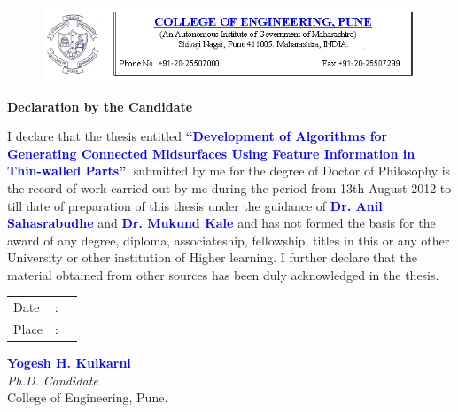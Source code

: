 \begin{figure} [!h]
	\centering
	\includegraphics[width=\linewidth]{..//Common/images/coep_header.png}
\end{figure}

\vspace*{50pt}

\begin{center}{\Huge \textbf{Declaration by the Candidate}}\end{center}

\vspace*{20pt}

\begin{flushleft}
I declare that the thesis entitled \textcolor{blue}{\textbf{``Development of Algorithms for Generating Connected Midsurfaces Using Feature Information in Thin-walled Parts''}}, submitted by me for the degree of Doctor of Philosophy is the record of work carried out by me during the period from 13th August 2012 to till date of preparation of this thesis under the guidance of \textcolor{blue}{\textbf{Dr. Anil Sahasrabudhe}} and \textcolor{blue}{\textbf{Dr. Mukund Kale}} and has not formed the basis for the award of any degree, diploma, associateship, fellowship, titles in this or any other University or other institution of Higher learning.
I further declare that the material obtained from other sources has been duly acknowledged in the thesis.

\end{flushleft}

\vspace*{120pt}

\begin{minipage}[t]{0.5\textwidth}%
\begin{tabular}{lcl}
Date & : &  \tabularnewline
Place &: &  \tabularnewline
\end{tabular}%
\end{minipage}\hspace{0.5cm}
\begin{minipage}[t]{0.4\textwidth}%
\begin{flushleft}
 {
\textcolor{blue}{\textbf{Yogesh H. Kulkarni}}\\
\emph{Ph.D. Candidate}}\\
College of Engineering, Pune.
\end{flushleft}

\end{minipage}
